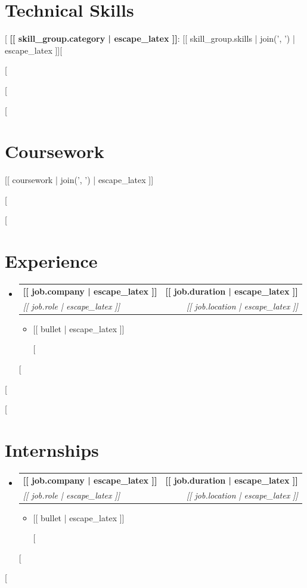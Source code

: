 \documentclass[letterpaper,11pt]{article}
\makeatletter
\newcommand{\resumeItem}[1]{
  \item\small{{#1 \vspace{-2pt}}}
}
\newcommand{\resumeSubheading}[4]{
  \vspace{-2pt}\item
    \begin{tabular*}{1.0\textwidth}[t]{l@{\extracolsep{\fill}}r}
      \textbf{#1} & \textbf{\small #2} \\
      \textit{\small#3} & \textit{\small #4} \\
    \end{tabular*}\vspace{-7pt}
}
\newcommand{\resumeSubHeadingListStart}{\begin{itemize}[leftmargin=0.0in, label={}]}
\newcommand{\resumeSubHeadingListEnd}{\end{itemize}}
\newcommand{\resumeItemListStart}{\begin{itemize}}
\newcommand{\resumeItemListEnd}{\end{itemize}\vspace{-5pt}}
\makeatother
\begin{document}
\section{Technical Skills}
 \begin{itemize}[leftmargin=0.15in, label={}]
    \small{\item{
    [%
     \textbf{[[ skill_group.category | escape_latex ]]}{: [[ skill_group.skills | join(', ') | escape_latex ]]}[%

    [%
    }}
 \end{itemize}
 \vspace{-16pt}
[%

[%
\section{Coursework}
 \begin{itemize}[leftmargin=0.15in, label={}]
    \small{\item{[[ coursework | join(', ') | escape_latex ]]}}
 \end{itemize}
 \vspace{-16pt}
[%

[%
\section{Experience}
  \resumeSubHeadingListStart
    [%
    \resumeSubheading
      {[[ job.company | escape_latex ]]}{[[ job.duration | escape_latex ]]}
      {[[ job.role | escape_latex ]]}{[[ job.location | escape_latex ]]}
      \resumeItemListStart
        [%
        \resumeItem{[[ bullet | escape_latex ]]}
        [%
      \resumeItemListEnd
    [%
  \resumeSubHeadingListEnd
\vspace{-16pt}
[%

[%
\section{Internships}
  \resumeSubHeadingListStart
    [%
    \resumeSubheading
      {[[ job.company | escape_latex ]]}{[[ job.duration | escape_latex ]]}
      {[[ job.role | escape_latex ]]}{[[ job.location | escape_latex ]]}
      \resumeItemListStart
        [%
        \resumeItem{[[ bullet | escape_latex ]]}
        [%
      \resumeItemListEnd
    [%
  \resumeSubHeadingListEnd
\vspace{-16pt}
[%
\end{document}
